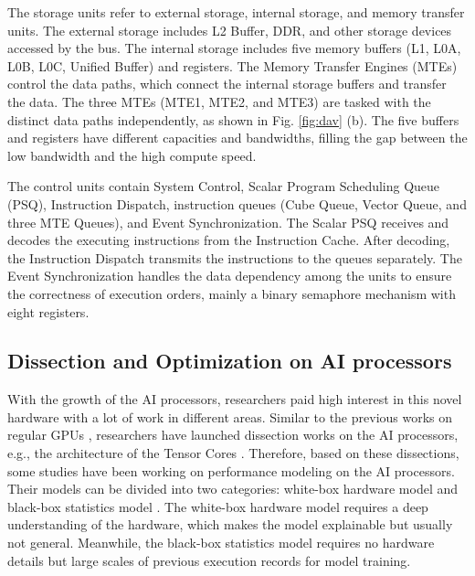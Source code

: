 \documentclass[12pt]{extbook}
\begin{document}
The storage units refer to external storage, internal storage, and memory transfer units. The external storage includes L2 Buffer, DDR, and other storage devices accessed by the bus. The internal storage includes five memory buffers (L1, L0A, L0B, L0C, Unified Buffer) and registers. The Memory Transfer Engines (MTEs) control the data paths, which connect the internal storage buffers and transfer the data. The three MTEs (MTE1, MTE2, and MTE3) are tasked with the distinct data paths independently, as shown in Fig. \ref{fig:dav} (b). The five buffers and registers have different capacities and bandwidths, filling the gap between the low bandwidth and the high compute speed. 
    
The control units contain System Control, Scalar Program Scheduling Queue (PSQ), Instruction Dispatch, instruction queues (Cube Queue, Vector Queue, and three MTE Queues), and Event Synchronization. The Scalar PSQ receives and decodes the executing instructions from the Instruction Cache. After decoding, the Instruction Dispatch transmits the instructions to the queues separately. The Event Synchronization handles the data dependency among the units to ensure the correctness of execution orders, mainly a binary semaphore mechanism with eight registers. 

\subsection{Dissection and Optimization on AI processors}

With the growth of the AI processors, researchers paid high interest in this novel hardware with a lot of work in different areas. Similar to the previous works on regular GPUs \cite{DBLP:conf/ppopp/ZhangTXLZC17}, researchers have launched dissection works on the AI processors, e.g., the architecture of the Tensor Cores \cite{DBLP:journals/corr/abs-1804-06826}. Therefore, based on these dissections, some studies have been working on performance modeling on the AI processors. Their models can be divided into two categories: white-box hardware model \cite{DBLP:conf/ispass/RaihanGA19} and black-box statistics model \cite{DBLP:conf/nips/ChenZYJMCGK18, DBLP:journals/corr/abs-2008-01040}. The white-box hardware model requires a deep understanding of the hardware, which makes the model explainable but usually not general. Meanwhile, the black-box statistics model requires no hardware details but large scales of previous execution records for model training. 
\end{document}
